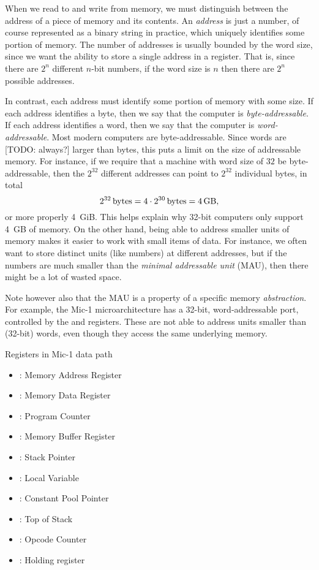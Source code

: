 \documentclass[article, a4paper, 11pt, oneside]{memoir}
\numberwithin{equation}{chapter}
\begin{document}
\begin{notelist}
When we read to and write from memory, we must distinguish between the address of a piece of memory and its contents. An \emph{address} is just a number, of course represented as a binary string in practice, which uniquely identifies some portion of memory. The number of addresses is usually bounded by the word size, since we want the ability to store a single address in a register. That is, since there are $2^n$ different $n$-bit numbers, if the word size is $n$ then there are $2^n$ possible addresses.

In contrast, each address must identify some portion of memory with some size. If each address identifies a byte, then we say that the computer is \emph{byte-addressable}. If each address identifies a word, then we say that the computer is \emph{word-addressable}. Most modern computers are byte-addressable. Since words are [TODO: always?] larger than bytes, this puts a limit on the size of addressable memory. For instance, if we require that a machine with word size of $32$ be byte-addressable, then the $2^{32}$ different addresses can point to $2^{32}$ individual bytes, in total
%
\begin{equation*}
    \SI[parse-numbers=false]{2^{32}}{bytes}
        = \SI[parse-numbers=false]{4 \cdot 2^{30}}{bytes}
        = \SI{4}{GB},
\end{equation*}
%
or more properly \SI{4}{GiB}. This helps explain why 32-bit computers only support \SI{4}{GB} of memory. On the other hand, being able to address smaller units of memory makes it easier to work with small items of data. For instance, we often want to store distinct units (like numbers) at different addresses, but if the numbers are much smaller than the \emph{minimal addressable unit} (MAU), then there might be a lot of wasted space.

Note however also that the MAU is a property of a specific memory \emph{abstraction}. For example, the Mic-1 microarchitecture has a 32-bit, word-addressable port, controlled by the  and  registers. These are not able to address units smaller than (32-bit) words, even though they access the same underlying memory.


\item[Registers in Mic-1 data path]
~
%
\begin{itemize}
    \item {}: Memory Address Register
    \item {}: Memory Data Register
    \item {}: Program Counter
    \item {}: Memory Buffer Register
    \item {}: Stack Pointer
    \item {}: Local Variable
    \item {}: Constant Pool Pointer
    \item {}: Top of Stack
    \item {}: Opcode Counter
    \item {}: Holding register
\end{itemize}


\end{notelist}
\end{document}
